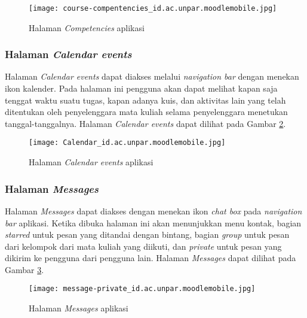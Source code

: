 \begin{enumerate}
\begin{figure}[H] 
	\centering  
	\texttt{[image: course-compentencies\_id.ac.unpar.moodlemobile.jpg]}  
	\caption[Halaman \textit{Competencies} aplikasi] {Halaman \textit{Competencies} aplikasi} 
	\label{app:competencies} 
\end{figure}  

\end{enumerate}

\subsubsection{Halaman \textit{Calendar events}}

Halaman \textit{Calendar events} dapat diakses melalui \textit{navigation bar} dengan menekan ikon kalender. Pada halaman ini pengguna akan dapat melihat kapan saja tenggat waktu suatu tugas, kapan adanya kuis, dan aktivitas lain yang telah ditentukan oleh penyelenggara mata kuliah selama penyelenggara menetukan tanggal-tanggalnya. Halaman \textit{Calendar events} dapat dilihat pada Gambar \ref{app:calendar}.

\begin{figure}[H] 
	\centering  
	\texttt{[image: Calendar\_id.ac.unpar.moodlemobile.jpg]}  
	\caption[Halaman \textit{Calendar events} aplikasi] {Halaman \textit{Calendar events} aplikasi} 
	\label{app:calendar} 
\end{figure}  

\subsubsection{Halaman \textit{Messages}}

Halaman \textit{Messages} dapat diakses dengan menekan ikon \textit{chat box} pada \textit{navigation bar} aplikasi. Ketika dibuka halaman ini akan menunjukkan menu kontak, bagian \textit{starred} untuk pesan yang ditandai dengan bintang, bagian \textit{group} untuk pesan dari kelompok dari mata kuliah yang diikuti, dan \textit{private} untuk pesan yang dikirim ke pengguna dari pengguna lain. Halaman \textit{Messages} dapat dilihat pada Gambar \ref{app:messages}.


\begin{figure}[H] 
	\centering  
	\texttt{[image: message-private\_id.ac.unpar.moodlemobile.jpg]}  
	\caption[Halaman \textit{Messages} aplikasi] {Halaman \textit{Messages} aplikasi} 
	\label{app:messages} 
\end{figure}  

